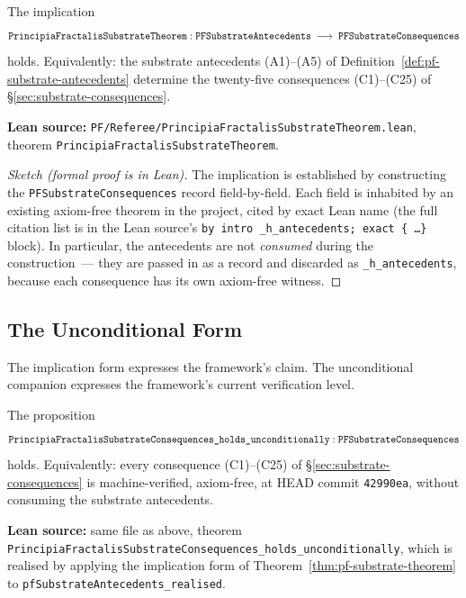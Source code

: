\begin{theorem}
\label{thm:pf-substrate-theorem}
The implication
\[
\texttt{Principia\allowbreak{}Fractalis\allowbreak{}Substrate\allowbreak{}Theorem} :
\texttt{PFSubstrateAntecedents}
\;\longrightarrow\;
\texttt{PFSubstrateConsequences}
\]
holds. Equivalently: the substrate antecedents (A1)--(A5) of
Definition~\ref{def:pf-substrate-antecedents} determine the
twenty-five consequences (C1)--(C25) of
\S\ref{sec:substrate-consequences}.

\textbf{Lean source:}
\texttt{PF/\allowbreak{}Referee/\allowbreak{}Principia\allowbreak{}Fractalis\allowbreak{}Substrate\allowbreak{}Theorem.\allowbreak{}lean},
theorem \texttt{Principia\allowbreak{}Fractalis\allowbreak{}Substrate\allowbreak{}Theorem}.
\end{theorem}

\begin{proof}[Sketch (formal proof is in Lean)]
The implication is established by constructing the
\texttt{PFSubstrateConsequences} record field-by-field. Each
field is inhabited by an existing axiom-free theorem in the
project, cited by exact Lean name (the full citation list is
in the Lean source's \texttt{by intro \_\allowbreak{}h\_\allowbreak{}antecedents; exact
\{ \dots \}} block). In particular, the antecedents are not
\emph{consumed} during the construction~--- they are passed
in as a record and discarded as \texttt{\_h\_antecedents},
because each consequence has its own axiom-free witness.
\end{proof}

\subsection{The Unconditional Form}
\label{subsec:substrate-meta-theorem-unconditional}

The implication form expresses the framework's claim. The
unconditional companion expresses the framework's current
verification level.

\begin{theorem}
\label{thm:pf-substrate-consequences-unconditional}
The proposition
\[
\texttt{Principia\allowbreak{}Fractalis\allowbreak{}Substrate\allowbreak{}Consequences\_\allowbreak{}holds\_\allowbreak{}unconditionally} :
\texttt{PFSubstrateConsequences}
\]
holds. Equivalently: every consequence (C1)--(C25) of
\S\ref{sec:substrate-consequences} is machine-verified,
axiom-free, at HEAD commit \texttt{42990ea}, without consuming
the substrate antecedents.

\textbf{Lean source:} same file as above, theorem
\texttt{Principia\allowbreak{}Fractalis\allowbreak{}Substrate\allowbreak{}Consequences\_\allowbreak{}holds\_\allowbreak{}unconditionally},
which is realised by applying the implication form of
Theorem~\ref{thm:pf-substrate-theorem} to
\texttt{pf\allowbreak{}Substrate\allowbreak{}Antecedents\_\allowbreak{}realised}.
\end{theorem}

